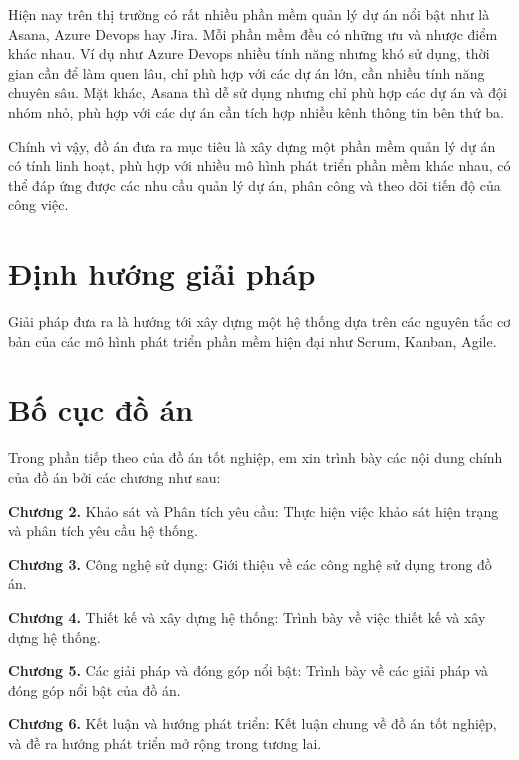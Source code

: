 \documentclass[../DoAn.tex]{subfiles}
\begin{document}
Hiện nay trên thị trường có rất nhiều phần mềm quản lý dự án nổi bật như là Asana, Azure Devops hay Jira. Mỗi phần mềm đều có những ưu và nhược điểm khác nhau.
Ví dụ như Azure Devops nhiều tính năng nhưng khó sử dụng, thời gian cần để làm quen lâu, chỉ phù hợp với các dự án lớn, cần nhiều tính năng chuyên sâu.
Mặt khác, Asana thì dễ sử dụng nhưng chỉ phù hợp các dự án và đội nhóm nhỏ, phù hợp với các dự án cần tích hợp nhiều kênh thông tin bên thứ ba.

Chính vì vậy, đồ án đưa ra mục tiêu là xây dựng một phần mềm quản lý dự án có tính linh hoạt, phù hợp với nhiều mô hình phát triển phần mềm khác nhau, có thể đáp ứng được các nhu cầu quản lý dự án,
phân công và theo dõi tiến độ của công việc.

\section{Định hướng giải pháp}
\label{section:1.3}

Giải pháp đưa ra là hướng tới xây dựng một hệ thống dựa trên các nguyên tắc cơ bản của các mô hình phát triển phần mềm hiện đại như Scrum, Kanban, Agile.

\section{Bố cục đồ án}
\label{section:1.4}

Trong phần tiếp theo của đồ án tốt nghiệp, em xin trình bày các nội dung chính của đồ án bởi các chương như sau:

\textbf{Chương 2.} Khảo sát và Phân tích yêu cầu: Thực hiện việc khảo sát hiện trạng và phân tích yêu cầu hệ thống.

\textbf{Chương 3.} Công nghệ sử dụng: Giới thiệu về các công nghệ sử dụng trong đồ án.

\textbf{Chương 4.} Thiết kế và xây dựng hệ thống: Trình bày về việc thiết kế và xây dựng hệ thống.

\textbf{Chương 5.} Các giải pháp và đóng góp nổi bật: Trình bày về các giải pháp và đóng góp nổi bật của đồ án.

\textbf{Chương 6.} Kết luận và hướng phát triển: Kết luận chung về đồ án tốt nghiệp, và đề ra hướng phát triển mở rộng trong tương lai.
\end{document}
